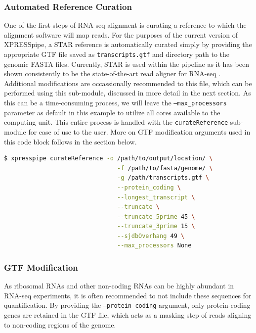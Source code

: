 \documentclass[10pt, oneside]{article}
\begin{document}
\subsubsection{Automated Reference Curation}
One of the first steps of RNA-seq alignment is curating a reference to which the alignment software will map reads. For the purposes of the current version of XPRESSpipe, a STAR \cite{star} reference is automatically curated simply by providing the appropriate GTF file saved as \texttt{transcripts.gtf} and directory path to the genomic FASTA files. Currently, STAR is used within the pipeline as it has been shown consistently to be the state-of-the-art read aligner for RNA-seq \cite{alignment_benchmark}. Additional modifications are occassionally recommended to this file, which can be performed using this sub-module, discussed in more detail in the next section. As this can be a time-consuming process, we will leave the \texttt{--max\_processors} parameter as default in this example to utilize all cores available to the computing unit. This entire process is handled with the \texttt{curateReference} sub-module for ease of use to the user. More on GTF modification arguments used in this code block follows in the section below.
\newline
\begin{lstlisting}[language=bash, caption=curateReference example]
$ xpresspipe curateReference -o /path/to/output/location/ \
                                -f /path/to/fasta/genome/ \
                                -g /path/transcripts.gtf \
                                --protein_coding \
                                --longest_transcript \
                                --truncate \
                                --truncate_5prime 45 \
                                --truncate_3prime 15 \
                                --sjdbOverhang 49 \
                                --max_processors None
\end{lstlisting}


\subsubsection{GTF Modification}
As ribosomal RNAs and other non-coding RNAs can be highly abundant in RNA-seq experiments, it is often recommended to not include these sequences for quantification. By providing the \texttt{--protein\_coding} argument, only protein-coding genes are retained in the GTF file, which acts as a masking step of reads aligning to non-coding regions of the genome. \par
\end{document}
